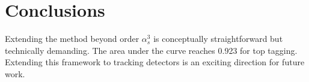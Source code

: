 \section{Conclusions}\label{sec:conclusions}

Extending the method beyond order $\alpha_s^3$ is conceptually
straightforward but technically demanding. The area under the curve
reaches 0.923 for top tagging. Extending this framework to tracking
detectors is an exciting direction for future work.

